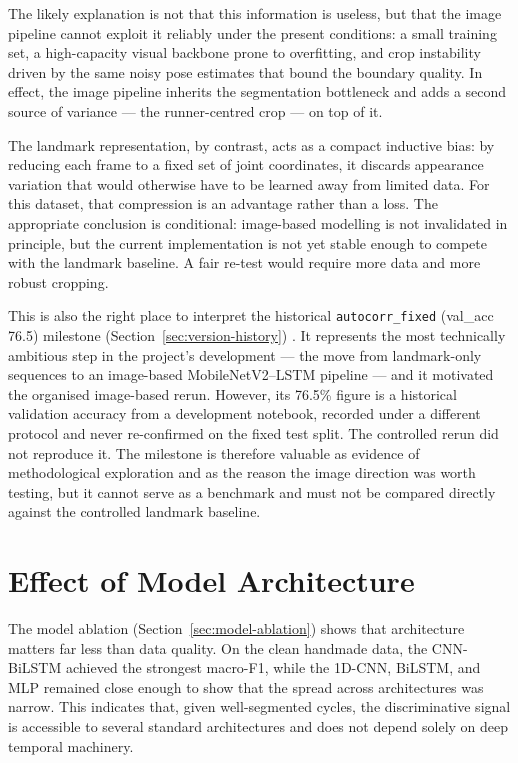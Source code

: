The likely explanation is not that this information is useless, but that the
image pipeline cannot exploit it reliably under the present conditions: a small
training set, a high-capacity visual backbone prone to overfitting, and crop
instability driven by the same noisy pose estimates that bound the boundary
quality. In effect, the image pipeline inherits the segmentation bottleneck and
adds a second source of variance --- the runner-centred crop --- on top of it.

The landmark representation, by contrast, acts as a compact inductive bias:
by reducing each frame to a fixed set of joint coordinates, it discards
appearance variation that would otherwise have to be learned away from limited
data. For this dataset, that compression is an advantage rather than a loss.
The appropriate conclusion is conditional: image-based modelling is not
invalidated in principle, but the current implementation is not yet stable
enough to compete with the landmark baseline. A fair re-test would require more
data and more robust cropping.

This is also the right place to interpret the historical
\texttt{autocorr\_fixed} (val\_acc 76.5) milestone
(Section~\ref{sec:version-history}) . It represents the most technically ambitious
step in the project's development --- the move from landmark-only sequences to
an image-based MobileNetV2--LSTM pipeline --- and it motivated the organised
image-based rerun. However, its 76.5\% figure is a historical validation
accuracy from a development notebook, recorded under a different protocol and
never re-confirmed on the fixed test split. The controlled rerun did not
reproduce it. The milestone is therefore valuable as evidence of methodological
exploration and as the reason the image direction was worth testing, but it
cannot serve as a benchmark and must not be compared directly against the
controlled landmark baseline.

\section{Effect of Model Architecture}
\label{sec:disc-model}

The model ablation (Section~\ref{sec:model-ablation}) shows that architecture
matters far less than data quality. On the clean handmade data, the CNN-BiLSTM
achieved the strongest macro-F1, while the 1D-CNN, BiLSTM, and MLP remained
close enough to show that the spread across architectures was narrow. This
indicates that, given well-segmented cycles, the discriminative signal is
accessible to several standard architectures and does not depend solely on deep
temporal machinery.

